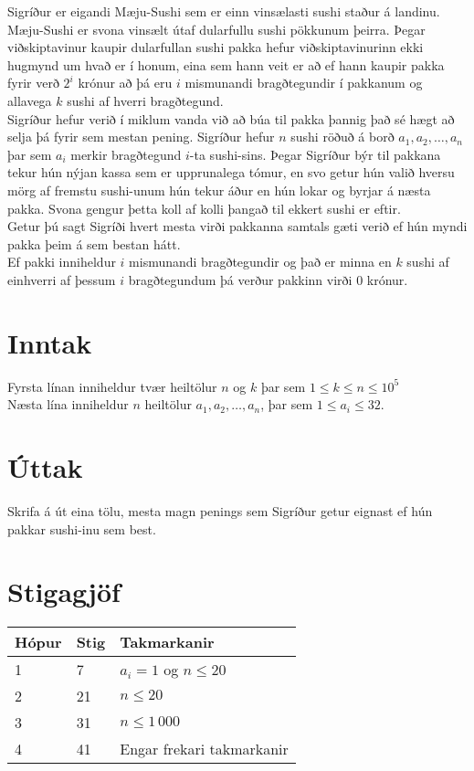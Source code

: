 
Sigríður er eigandi Mæju-Sushi sem er einn vinsælasti sushi staður á landinu.
Mæju-Sushi er svona vinsælt útaf dularfullu sushi pökkunum þeirra.
Þegar viðskiptavinur kaupir dularfullan sushi pakka hefur viðskiptavinurinn ekki 
hugmynd um hvað er í honum, eina sem hann veit er að ef hann kaupir 
pakka fyrir verð $2^{i}$ krónur að þá eru $i$ mismunandi
bragðtegundir í pakkanum og allavega $k$ sushi af hverri bragðtegund. \\

Sigríður hefur verið í miklum vanda við að búa til pakka þannig það sé hægt að selja þá
fyrir sem mestan pening. Sigríður hefur $n$ sushi röðuð á borð $a_1,a_2,\ldots,a_n$ þar sem 
$a_i$ merkir bragðtegund $i$-ta sushi-sins. Þegar Sigríður býr til pakkana
tekur hún nýjan kassa sem er upprunalega tómur, en svo getur hún valið hversu
mörg af fremstu sushi-unum hún tekur áður en hún lokar og byrjar á næsta pakka.
Svona gengur þetta koll af kolli þangað til ekkert sushi er eftir. \\

Getur þú sagt Sigríði hvert mesta virði pakkanna samtals gæti verið ef hún
myndi pakka þeim á sem bestan hátt. \\

Ef pakki inniheldur $i$ mismunandi bragðtegundir og það er minna en $k$ sushi
af einhverri af þessum $i$ bragðtegundum þá verður pakkinn virði $0$ krónur. \\

\section*{Inntak}
Fyrsta línan inniheldur tvær heiltölur $n$ og $k$ þar sem $1 \le k \le n \le 10^5$ \\
Næsta lína inniheldur $n$ heiltölur $a_1,a_2,\ldots,a_n$, þar sem $1 \le a_i \le 32$. \\

\section*{Úttak}
Skrifa á út eina tölu, mesta magn penings sem Sigríður getur eignast ef hún pakkar sushi-inu sem best. \\

\section*{Stigagjöf}
\begin{tabular}{|l|l|l|}
\hline
Hópur & Stig & Takmarkanir \\ \hline
1     & 7    & $a_i = 1$ og $n \le 20$ \\ \hline
2     & 21   & $n \le 20$ \\ \hline
3     & 31   & $n \le 1\,000$ \\ \hline
4     & 41   & Engar frekari takmarkanir \\ \hline
\end{tabular}
